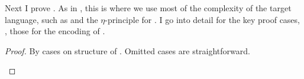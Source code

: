 Next I prove .
As in , this is where we use most of the complexity of the
target language, such as  and the \(\eta\)-principle for
.
I go into detail for the key proof cases, \ie, those for the encoding of .
\begin{lemma}[Compositionality]
  \label{lem:cc:pres-subst}
  \im{\cctrans{(\subst{\se}{\sepr}{\sx})} \equiv \subst{\cctrans{\se}}{\cctrans{\sepr}}{\sx}}

\end{lemma}
\begin{proof}
  By cases on structure of \im{\se}.
  Omitted cases are straightforward.
  \begin{proofcases}
  \item \im{\se = \spity{\sy}{\sA}{\sB}}


\end{proofcases}
\end{proof}
